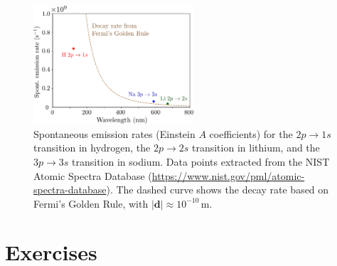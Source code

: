 \documentclass[prx,12pt]{revtex4-2}
\begin{document}
\begin{figure}[h]
  \centering\includegraphics[width=0.53\textwidth]{emissionrates}
  \caption{Spontaneous emission rates (Einstein $A$ coefficients) for
    the $2p\rightarrow 1s$ transition in hydrogen, the
    $2p\rightarrow2s$ transition in lithium, and the $3p\rightarrow3s$
    transition in sodium.  Data points extracted from the NIST Atomic
    Spectra Database
    (\href{https://www.nist.gov/pml/atomic-spectra-database}{https://www.nist.gov/pml/atomic-spectra-database}).
    The dashed curve shows the decay rate based on Fermi's Golden
    Rule, with $|\mathbf{d}| \approx 10^{-10}\,\mathrm{m}$.  }
\end{figure}


\section*{Exercises}
\end{document}
